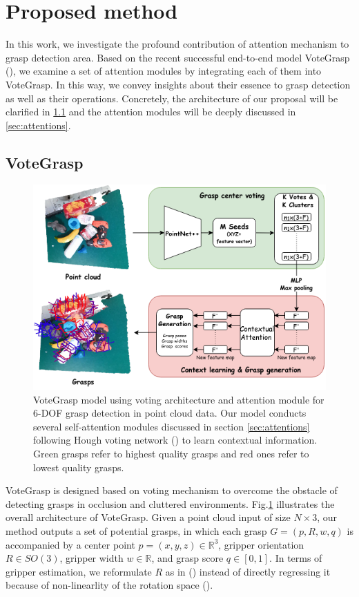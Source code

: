 \section{Proposed method}
\label{sec:method}

In this work, we investigate the profound contribution of attention mechanism to grasp detection area. Based on the recent successful end-to-end model VoteGrasp (\textcolor{cyan}{\cite{hoang2022context}}), we examine a set of attention modules by integrating each of them into VoteGrasp. In this way, we convey insights about their essence to grasp detection as well as their operations. Concretely, the architecture of our proposal will be clarified in \ref{sec:vote_grasp} and the attention modules will be deeply discussed in \ref{sec:attentions}.

\subsection{VoteGrasp}
\label{sec:vote_grasp}

\begin{figure}[h!]
	\centering
	\includegraphics[width=0.8\linewidth]{figs/VoteGrasp.png}	
	\caption{VoteGrasp model using voting architecture and attention module for 6-DOF grasp detection in point cloud data. Our model conducts several self-attention modules discussed in section \ref{sec:attentions} following Hough voting network (\textcolor{cyan}{\cite{qi2019deep}}) to learn contextual information. Green grasps refer to highest quality grasps and red ones refer to lowest quality grasps.}
	\label{fig:VoteGrasp}
\end{figure}

VoteGrasp is designed based on voting mechanism to overcome the obstacle of detecting grasps in occlusion and cluttered environments. Fig.\ref{fig:VoteGrasp} illustrates the overall architecture of VoteGrasp. Given a point cloud input of size $N\times3$, our method outputs a set of potential grasps, in which each grasp $G=(p,R,w,q)$ is accompanied by a center point $p=(x, y, z) \in \mathbb{R}^3$, gripper orientation $R \in SO(3)$, gripper width $w \in \mathbb{R}$, and grasp score $q \in [0,1]$. In terms of gripper estimation, we reformulate $R$ as in (\textcolor{cyan}{\cite{kehl2017ssd}}) instead of directly regressing it because of non-linearlity of the rotation space (\textcolor{cyan}{\cite{peng2019pvnet}}). 

